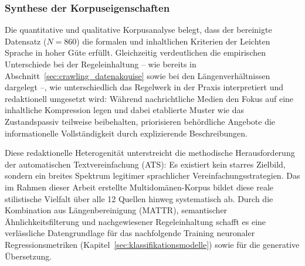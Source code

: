 \subsubsection{Synthese der Korpuseigenschaften}
\label{sec:korpus_synthese}

Die quantitative und qualitative Korpusanalyse belegt, dass der bereinigte Datensatz ($N=860$) die formalen und inhaltlichen Kriterien der Leichten Sprache in hoher Güte erfüllt. Gleichzeitig verdeutlichen die empirischen Unterschiede bei der Regeleinhaltung – wie bereits in Abschnitt~\ref{sec:crawling_datenakquise} sowie bei den Längenverhältnissen dargelegt –, wie unterschiedlich das Regelwerk in der Praxis interpretiert und redaktionell umgesetzt wird: Während nachrichtliche Medien den Fokus auf eine inhaltliche Kompression legen und dabei etablierte Muster wie das Zustandspassiv teilweise beibehalten, priorisieren behördliche Angebote die informationelle Vollständigkeit durch explizierende Beschreibungen. 

Diese redaktionelle Heterogenität unterstreicht die methodische Herausforderung der automatischen Textvereinfachung (ATS): Es existiert kein starres Zielbild, sondern ein breites Spektrum legitimer sprachlicher Vereinfachungsstrategien. Das im Rahmen dieser Arbeit erstellte Multidomänen-Korpus bildet diese reale stilistische Vielfalt über alle 12 Quellen hinweg systematisch ab. Durch die Kombination aus Längenbereinigung (MATTR), semantischer Ähnlichkeitsfilterung und nachgewiesener Regeleinhaltung schafft es eine verlässliche Datengrundlage für das nachfolgende Training neuronaler Regressionsmetriken (Kapitel~\ref{sec:klassifikationsmodelle}) sowie für die generative Übersetzung.